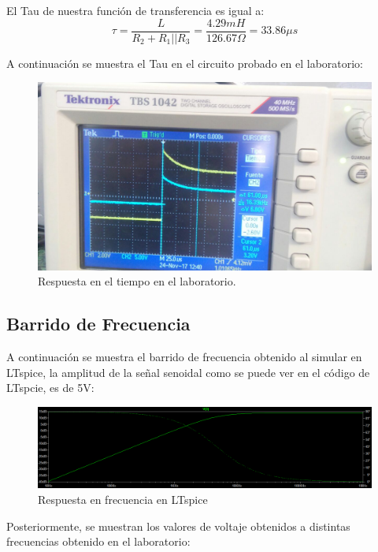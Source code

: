 \documentclass{article}
\begin{document}
El Tau de nuestra función de transferencia es igual a:
\begin{equation}
\tau=\frac{L}{R_2+R_1||R_3}=\frac{4.29mH}{126.67\Omega}=33.86\mu s
\end{equation}

A continuación se muestra el Tau en el circuito probado en el laboratorio:

\begin{figure}[H]
	\centering
	\includegraphics[width=0.7\linewidth]{tlab}
	\caption{Respuesta en el tiempo en el laboratorio.}
	\label{fig:tlab}
\end{figure}


\subsection{Barrido de Frecuencia}
A continuación se muestra el barrido de frecuencia obtenido al simular en LTspice, la amplitud de la señal senoidal como se puede ver en el código de LTspcie, es de 5V:

\begin{figure}[H]
	\centering
	\includegraphics[width=0.7\linewidth]{frlt}
	\caption{Respuesta en frecuencia en LTspice}
	\label{fig:frlt}
\end{figure}

Posteriormente, se muestran los valores de voltaje obtenidos a distintas frecuencias obtenido en el laboratorio:
\end{document}
